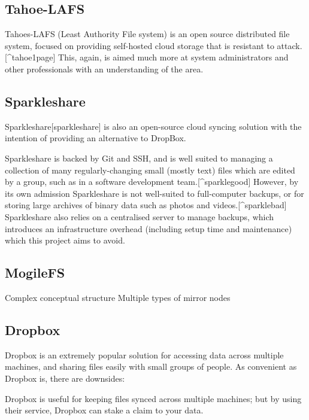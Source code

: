 \documentclass[12pt,a4paper,]{adreport}
\begin{document}
\subsection{Tahoe-LAFS}\label{tahoe-lafs}

Tahoes-LAFS (Least Authority File system) is an open source distributed
file system, focused on providing self-hosted cloud storage that is
resistant to attack.{[}\^{}tahoe1page{]} This, again, is aimed much more
at system administrators and other professionals with an understanding
of the area.

\subsection{Sparkleshare}\label{sparkleshare}

Sparkleshare{[}sparkleshare{]} is also an open-source cloud syncing
solution with the intention of providing an alternative to DropBox.

Sparkleshare is backed by Git and SSH, and is well suited to managing a
collection of many regularly-changing small (mostly text) files which
are edited by a group, such as in a software development
team.{[}\^{}sparklegood{]} However, by its own admission Sparkleshare is
not well-suited to full-computer backups, or for storing large archives
of binary data such as photos and videos.{[}\^{}sparklebad{]}
Sparkleshare also relies on a centralised server to manage backups,
which introduces an infrastructure overhead (including setup time and
maintenance) which this project aims to avoid.

\subsection{MogileFS}\label{mogilefs}

Complex conceptual structure Multiple types of mirror nodes

\subsection{Dropbox}\label{dropbox}

Dropbox is an extremely popular solution for accessing data across
multiple machines, and sharing files easily with small groups of people.
As convenient as Dropbox is, there are downsides:

Dropbox is useful for keeping files synced across multiple machines; but
by using their service, Dropbox can stake a claim to your data.
\end{document}
